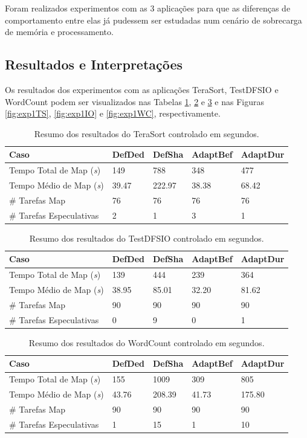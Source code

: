 Foram realizados experimentos com as 3 aplicações para que as diferenças de comportamento entre elas já pudessem ser estudadas num cenário de sobrecarga de memória e processamento.

\subsection{Resultados e Interpretações}
Os resultados dos experimentos com as aplicações TeraSort, TestDFSIO e WordCount podem ser visualizados nas Tabelas \ref{tab:exp1TS}, \ref{tab:exp1IO} e \ref{tab:exp1WC} e nas Figuras \ref{fig:exp1TS}, \ref{fig:exp1IO} e \ref{fig:exp1WC}, respectivamente.

\begin{table}[!ht]
	\caption{Resumo dos resultados do TeraSort controlado em segundos.} \label{tab:exp1TS}
	\begin{tabular*}{\hsize}{l|llll}
		\textbf{Caso} & \textbf{DefDed} & \textbf{DefSha} & \textbf{AdaptBef} & \textbf{AdaptDur}\\
		\hline
		Tempo Total de Map ({\it{s}}) & 149 & 788 & 348 & 477 \\
		Tempo Médio de Map ({\it{s}}) & 39.47 & 222.97 & 38.38 & 68.42 \\
		\# Tarefas Map & 76 & 76 & 76 & 76 \\
		\# Tarefas Especulativas & 2 & 1 & 3 & 1 \\
	\end{tabular*}
\end{table}

\begin{table}[!ht]
	\caption{Resumo dos resultados do TestDFSIO controlado em segundos.} \label{tab:exp1IO}
	\begin{tabular*}{\hsize}{l|llll}
		\textbf{Caso} & \textbf{DefDed} & \textbf{DefSha} & \textbf{AdaptBef} & \textbf{AdaptDur}\\
		\hline
		Tempo Total de Map ({\it{s}}) & 139 & 444 & 239 & 364 \\
		Tempo Médio de Map ({\it{s}}) & 38.95 & 85.01 & 32.20 & 81.62 \\
		\# Tarefas Map & 90 & 90 & 90 & 90 \\
		\# Tarefas Especulativas & 0 & 9 & 0 & 1 \\
	\end{tabular*}
\end{table}


\begin{table}[!ht]
	\caption{Resumo dos resultados do WordCount controlado em segundos.} \label{tab:exp1WC}
	\begin{tabular*}{\hsize}{l|llll}
		\textbf{Caso} & \textbf{DefDed} & \textbf{DefSha} & \textbf{AdaptBef} & \textbf{AdaptDur}\\
		\hline
		Tempo Total de Map ({\it{s}}) & 155 & 1009 & 309 & 805 \\
		Tempo Médio de Map ({\it{s}}) & 43.76 & 208.39 & 41.73 & 175.80 \\
		\# Tarefas Map & 90 & 90 & 90 & 90 \\
		\# Tarefas Especulativas & 1 & 15 & 1 & 10 \\
	\end{tabular*}
\end{table}

